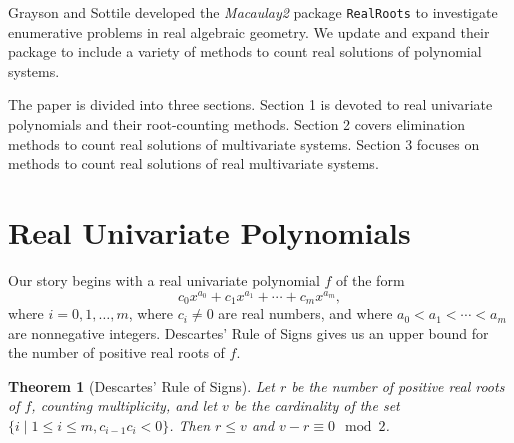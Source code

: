 \documentclass[12pt]{amsart}
\newtheorem{theorem}{Theorem}
\newtheorem{corollary}[theorem]{Corollary}
\theoremstyle{definition}
\begin{document}

Grayson and Sottile \cite{MR1949550} developed the \textit{Macaulay2} package \texttt{RealRoots} to investigate enumerative problems in real algebraic geometry. We update and expand their package to include a variety of methods to count real solutions of polynomial systems. 

The paper is divided into three sections. Section 1 is devoted to real univariate polynomials and their root-counting methods. Section 2 covers elimination methods to count real solutions of multivariate systems. Section 3 focuses on methods to count real solutions of real multivariate systems.

\section{Real Univariate Polynomials}

Our story begins with a real univariate polynomial $f$ of the form $$c_{0}x^{a_{0}} + c_{1}x^{a_{1}} + \cdots + c_{m}x^{a_{m}},$$ where $i=0,1,\dots, m$, where $c_{i} \neq 0$ are real numbers, and where $a_{0} < a_{1} < \cdots < a_{m}$ are nonnegative integers. Descartes' Rule of Signs \cite{MR2830310} gives us an upper bound for the number of positive real roots of $f$.

\begin{theorem}[Descartes' Rule of Signs]Let $r$ be the number of positive real roots of $f$, counting multiplicity, and let $v$ be the cardinality of the set $\{i\mid1\leq i\leq m, c_{i-1}c_{i}<0\}$. Then $r\leq v$ and $v-r\equiv 0 \mod 2$. \end{theorem}



\end{document}
